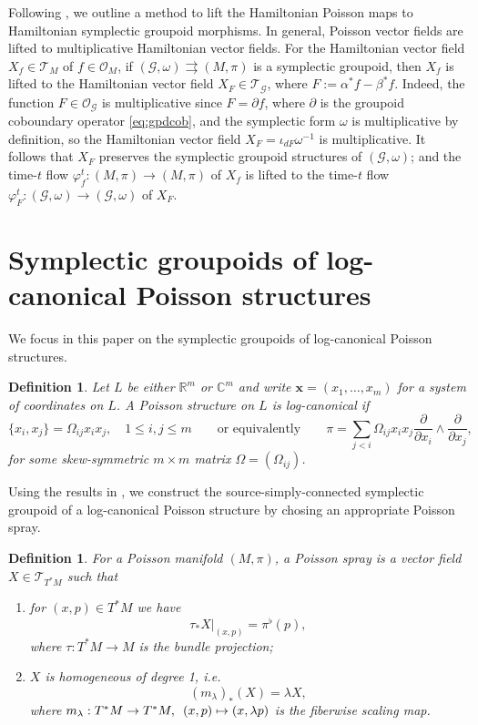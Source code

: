\documentclass{amsart}
\newtheorem{definition}[theorem]{Definition}
\numberwithin{equation}{section}
\newcommand{\bfx}{{\boldsymbol{x}}}
\newcommand{\cG}{\mathcal{G}}
\newcommand{\cO}{\mathcal{O}}
\newcommand{\cT}{\mathcal{T}}
\newcommand{\CC}{\mathbb{C}}
\newcommand{\RR}{\mathbb{R}}
\newcommand{\rra}{\rightrightarrows}
\begin{document}
Following \cite{Fer07}, we outline a method to lift the Hamiltonian Poisson maps to Hamiltonian symplectic groupoid morphisms.
In general, Poisson vector fields are lifted to multiplicative Hamiltonian vector fields.
For the Hamiltonian vector field $X_f \in \cT_M$ of $f \in \cO_M$, if $(\cG, \omega) \rra (M, \pi)$ is a symplectic groupoid, then $X_f$ is lifted to the Hamiltonian vector field $X_F \in \cT_\cG$, where $F := \alpha^*f - \beta^*f$.
Indeed, the function $F \in \cO_\cG$ is multiplicative since $F = \partial f$, where $\partial$ is the groupoid coboundary operator \eqref{eq:gpdcob}, and the symplectic form $\omega$ is multiplicative by definition, so the Hamiltonian vector field $X_F = \iota_{dF}\omega^{-1}$ is multiplicative.
It follows that $X_F$ preserves the symplectic groupoid structures of $(\cG,\omega)$; and the time-$t$ flow $\varphi^t_f: (M, \pi) \to (M, \pi)$ of $X_f$ is lifted to the time-$t$ flow $\varphi^t_F: (\cG, \omega) \to (\cG, \omega)$ of $X_F$.


\section{Symplectic groupoids of log-canonical Poisson structures}
\label{sec:local}
We focus in this paper on the symplectic groupoids of log-canonical Poisson structures.
\begin{definition} 
  \label{def: logPoisson}
  Let $L$ be either $\RR^m$ or $\CC^m$ and write $\bfx = (x_1, \ldots, x_m)$ for a system of coordinates on $L$.
  A Poisson structure on $L$ is \emph{log-canonical} if
  $$
    \{x_i, x_j\} = \Omega_{ij} x_ix_j, \quad 1 \leq i,j \leq m \qquad \text{or equivalently} \qquad
    \pi = \sum_{j < i} \Omega_{ij} x_ix_j\frac{\partial}{\partial x_i} \wedge \frac{\partial}{\partial x_j},
  $$
  for some skew-symmetric $m\times m$ matrix $\Omega = (\Omega_{ij})$.
\end{definition}

Using the results in \cite{CM11, CMS17}, we construct the source-simply-connected symplectic groupoid of a log-canonical Poisson structure by chosing an appropriate Poisson spray. 
\begin{definition} 
  \cite{CM11}
  For a Poisson manifold $(M, \pi)$, a \emph{Poisson spray} is a vector field $X \in \cT_{T^*M}$ such that
  \begin{enumerate}
    \item for $(x,p) \in T^*M$ we have
      \[\tau_* X|_{(x,p)} = \pi^\flat(p),\]
      where $\tau: T^*M \to M$ is the bundle projection;
    \item $X$ is homogeneous of degree 1, i.e.
      \[(m_\lambda)_*(X) = \lambda X,\]
      where $m_\lambda: T^*M \to T^*M, \enskip (x,p) \mapsto (x,\lambda p)$ is the fiberwise scaling map.
  \end{enumerate}
\end{definition}
\end{document}
